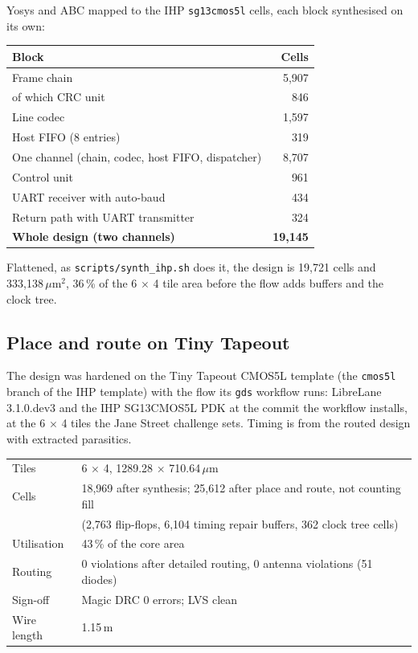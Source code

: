 \documentclass[11pt,a4paper]{article}
\newcommand{\sig}[1]{\texttt{#1}}
\begin{document}
Yosys and ABC mapped to the IHP \sig{sg13cmos5l} cells, each block synthesised on its own:

\begin{center}
\begin{tabular}{@{}lr@{}}
\toprule
Block & Cells \\
\midrule
Frame chain & 5,907 \\
\quad of which CRC unit & 846 \\
Line codec & 1,597 \\
Host FIFO (8 entries) & 319 \\
One channel (chain, codec, host FIFO, dispatcher) & 8,707 \\
Control unit & 961 \\
UART receiver with auto-baud & 434 \\
Return path with UART transmitter & 324 \\
\midrule
\textbf{Whole design (two channels)} & \textbf{19,145} \\
\bottomrule
\end{tabular}
\end{center}

Flattened, as \sig{scripts/synth\_ihp.sh} does it, the design is 19,721 cells and 333,138\,$\mu$m$^2$, 36\,\% of the 6 $\times$ 4 tile area before the flow adds buffers and the clock tree.

\subsection{Place and route on Tiny Tapeout}

The design was hardened on the Tiny Tapeout CMOS5L template (the \sig{cmos5l} branch of the IHP template) with the flow its \sig{gds} workflow runs: LibreLane 3.1.0.dev3 and the IHP SG13CMOS5L PDK at the commit the workflow installs, at the 6 $\times$ 4 tiles the Jane Street challenge sets. Timing is from the routed design with extracted parasitics.

\begin{center}
\begin{tabular}{@{}ll@{}}
\toprule
Tiles & 6 $\times$ 4, 1289.28 $\times$ 710.64\,$\mu$m \\
Cells & 18,969 after synthesis; 25,612 after place and route, not counting fill \\
 & (2,763 flip-flops, 6,104 timing repair buffers, 362 clock tree cells) \\
Utilisation & 43\,\% of the core area \\
Routing & 0 violations after detailed routing, 0 antenna violations (51 diodes) \\
Sign-off & Magic DRC 0 errors; LVS clean \\
Wire length & 1.15\,m \\
\bottomrule
\end{tabular}
\end{center}
\end{document}
